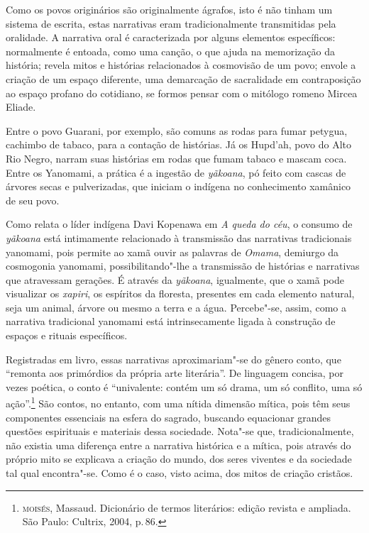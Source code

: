 Como os povos originários são originalmente ágrafos, isto é não tinham um sistema de escrita, estas narrativas eram tradicionalmente transmitidas pela oralidade.
A narrativa oral é caracterizada por alguns elementos específicos: normalmente é entoada, como uma canção, o que ajuda na memorização da história; revela mitos e histórias relacionados à cosmovisão de um povo; envole a criação de um espaço diferente, uma demarcação de sacralidade em contraposição ao espaço profano do cotidiano, se formos pensar com o mitólogo romeno Mircea Eliade.

Entre o povo Guarani, por exemplo, são comuns as rodas para fumar petygua, cachimbo de tabaco, para a contação de histórias. Já os Hupd’ah, povo do Alto Rio Negro, narram suas histórias em rodas que fumam tabaco e mascam coca.
Entre os Yanomami, a prática é a ingestão de \textit{yãkoana}, pó feito com cascas de árvores secas e pulverizadas, que iniciam o indígena no conhecimento xamânico de seu povo.

Como relata o líder indígena Davi Kopenawa em \textit{A queda do céu}, o consumo
de \textit{yãkoana} está intimamente relacionado à transmissão das narrativas tradicionais yanomami, pois permite ao xamã ouvir as palavras de \textit{Omama}, demiurgo da cosmogonia yanomami, possibilitando"-lhe a transmissão de histórias e narrativas que atravessam gerações. É através da \textit{yãkoana}, igualmente, que o xamã pode visualizar os \textit{xapiri}, os espíritos da floresta, presentes em cada elemento natural, seja um animal, árvore ou mesmo a terra e a água.
Percebe"-se, assim, como a narrativa tradicional yanomami está intrinsecamente ligada à construção de espaços e rituais específicos.

Registradas em livro, essas narrativas aproximariam"-se do gênero conto,
que ``remonta aos primórdios da própria arte literária''.
De linguagem concisa, por vezes poética, o conto é ``univalente: contém um só drama, um só conflito, uma só ação''.\footnote{\textsc{moisés}, Massaud. Dicionário de termos literários: edição revista e ampliada. São Paulo: Cultrix, 2004, p.\,86.}
São contos, no entanto, com uma nítida dimensão mítica, pois têm
seus componentes essenciais na esfera do sagrado, buscando equacionar
grandes questões espirituais e materiais dessa sociedade.
Nota"-se que, tradicionalmente, não existia uma diferença entre a narrativa histórica e a mítica, pois através do próprio mito se explicava a criação do mundo, dos seres viventes e da sociedade tal qual encontra"-se.
Como é o caso, visto acima, dos mitos de criação cristãos.

